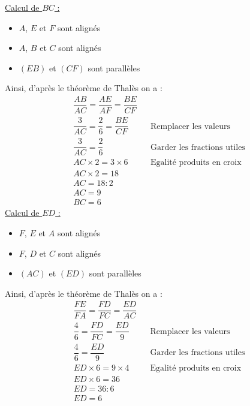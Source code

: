 \begin{multicols}{2}
    \underline{Calcul de $BC$ :}

    \begin{itemize}
      \item $A$, $E$ et $F$ sont alignés
      \item $A$, $B$ et $C$ sont alignés
      \item $(EB)$ et $(CF)$ sont parallèles
    \end{itemize}
    Ainsi, d'après le théorème de Thalès on a :
    \begin{align*}
      &\dfrac{AB}{AC}=\dfrac{AE}{AF}=\dfrac{BE}{CF}&&\\
      &\dfrac{3}{AC}=\dfrac{2}{6}=\dfrac{BE}{CF}&&\text{Remplacer les valeurs}\\
      &\dfrac{3}{AC}=\dfrac{2}{6}&&\text{Garder les fractions utiles}\\
      &AC\times 2=3\times 6 &&\text{Egalité produits en croix}\\
      &AC\times 2=18 &&\\
      &AC=18:2&&\\
      &AC=9&&\\
      &BC=6&&
    \end{align*}
    \underline{Calcul de $ED$ :}

    \begin{itemize}
      \item $F$, $E$ et $A$ sont alignés
      \item $F$, $D$ et $C$ sont alignés
      \item $(AC)$ et $(ED)$ sont parallèles
    \end{itemize}
    Ainsi, d'après le théorème de Thalès on a :
    \begin{align*}
      &\dfrac{FE}{FA}=\dfrac{FD}{FC}=\dfrac{ED}{AC}&&\\
      &\dfrac{4}{6}=\dfrac{FD}{FC}=\dfrac{ED}{9}&&\text{Remplacer les valeurs}\\
      &\dfrac{4}{6}=\dfrac{ED}{9} &&\text{Garder les fractions utiles}\\
      &ED\times 6=9\times 4&&\text{Egalité produits en croix}\\
      &ED\times 6=36 &&\\
      &ED=36:6 &&\\
      &ED=6
    \end{align*}
  \end{multicols}

\exo{}{}


